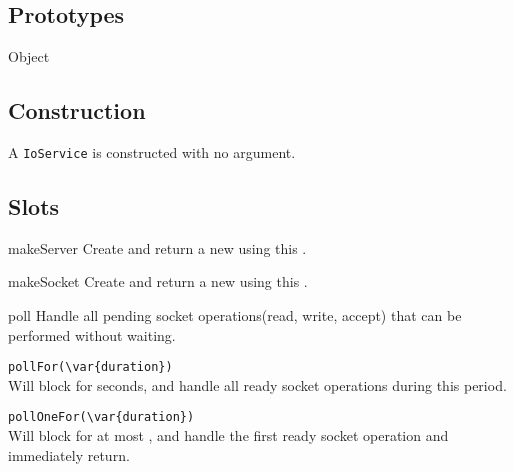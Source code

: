 \subsection{Prototypes}
\begin{refObjects}
\item[Object]
\end{refObjects}

\subsection{Construction}

A \lstinline|IoService| is constructed with no argument. 

\subsection{Slots}

\begin{urbiscriptapi}
\item[makeServer]
  Create and return a new  using this .

\item[makeSocket]
  Create and return a new  using this .

\item[poll]
  Handle all pending socket operations(read, write, accept) that can be
  performed without waiting.

\item \lstinline|pollFor(\var{duration})|\\
  Will block for  seconds, and handle all ready socket operations
  during this period.

\item \lstinline|pollOneFor(\var{duration})|\\
  Will block for at most , and handle the first ready socket
  operation and immediately return.

\end{urbiscriptapi}

